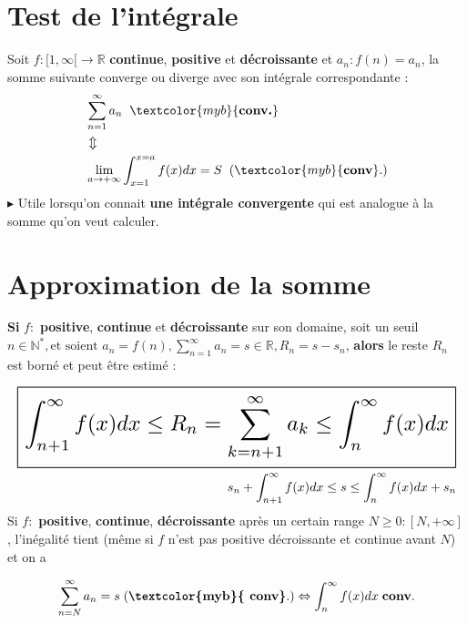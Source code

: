 \documentclass{report}
\begin{document}
\begin{multicols*}{3}
    \section{Test de l'intégrale}
        Soit $f : [1, \infty [ \rightarrow  \mathbb{R}$ 
        \textbf{continue}, \textbf{positive} et \textbf{décroissante} 
        et $a_n : f(n) = a_n$, la somme suivante converge ou diverge avec 
        son intégrale correspondante :
            \begin{align*}
                &\sum_{n=1}^{\infty }a_n \;\; \textcolor{myb}{\textbf{conv.}} 
                \\
                & \Updownarrow 
                \\
                &\lim\limits_{a \to +\infty }\int_{x=1}^{x = a}f(x)dx = S \;\; 
                (\textcolor{myb}{\textbf{conv}}.)    
            \end{align*}
    $\blacktriangleright$ Utile lorsqu'on connait \textbf{une intégrale convergente} qui est 
    analogue à la somme qu'on veut calculer. 


    \section{Approximation de la somme}
        \textbf{Si} $f:$ \textbf{positive}, \textbf{continue} et \textbf{décroissante} 
        sur son domaine, soit un seuil $n \in \mathbb{N}^*, \text{et  soient }  
        a_n = f(n), \sum_{n=1}^{\infty }a_n = s \in \mathbb{R}, 
        R_n = s - s_n$, \textbf{alors} le reste $R_n$ est borné et peut être 
         estimé :

     \begin{align*}
        \resizebox{1\linewidth}{!}{$ 
            \boxed{
                \int_{n+1}^{\infty }f(x)dx \leq R_n 
                = 
                \sum_{k=n+1}^{\infty} a_k 
                \leq \int_{n}^{\infty }f(x)dx
            }
        $}
        \\ 
        s_n + \int_{n+1}^{\infty }f(x)dx \leq s  
        \leq \int_{n}^{\infty }f(x)dx + s_n
     \end{align*}
     Si $f:$ \textbf{positive}, \textbf{continue},  \textbf{décroissante} 
     après un certain range $N \geq 0 : [N, +\infty]$, l'inégalité tient 
     (même si $f$ n'est pas positive décroissante et continue avant $N$) 
     et on a 
    
     \begin{align*}
         \sum_{n=N}^{\infty} a_n = s \; 
         (\textbf{\textcolor{myb}{ conv}}.) 
         \Leftrightarrow    
         \int_{n}^{\infty }f(x)dx  \; \textbf{conv}.   
     \end{align*}               



\end{multicols*}
\end{document}
